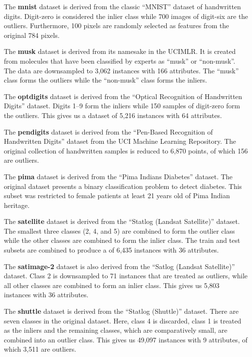 \documentclass{article}
\begin{document}
The \textbf{mnist} dataset is derived from the classic ``MNIST'' dataset of handwritten digits.
Digit-zero is considered the inlier class while 700 images of digit-six are the outliers.
Furthermore, 100 pixels are randomly selected as features from the original 784 pixels.

The \textbf{musk} dataset is derived from its namesake in the UCIMLR\@.
It is created from molecules that have been classified by experts as ``musk'' or ``non-musk''.
The data are downsampled to 3,062 instances with 166 attributes.
The ``musk'' class forms the outliers while the ``non-musk'' class forms the inliers.

The \textbf{optdigits} dataset is derived from the ``Optical Recognition of Handwritten Digits'' dataset.
Digits 1--9 form the inliers while 150 samples of digit-zero form the outliers.
This gives us a dataset of 5,216 instances with 64 attributes.

The \textbf{pendigits} dataset is derived from the ``Pen-Based Recognition of Handwritten Digits'' dataset from the UCI Machine Learning Repository.
The original collection of handwritten samples is reduced to 6,870 points, of which 156 are outliers.

The \textbf{pima} dataset is derived from the ``Pima Indians Diabetes'' dataset.
The original dataset presents a binary classification problem to detect diabetes.
This subset was restricted to female patients at least 21 years old of Pima Indian heritage.

The \textbf{satellite} dataset is derived from the ``Statlog (Landsat Satellite)'' dataset.
The smallest three classes (2, 4, and 5) are combined to form the outlier class while the other classes are combined to form the inlier class.
The train and test subsets are combined to produce a of 6,435 instances with 36 attributes.

The \textbf{satimage-2} dataset is also derived from the ``Satlog (Landsat Satellite)'' dataset.
Class 2 is downsampled to 71 instances that are treated as outliers, while all other classes are combined to form an inlier class.
This gives us 5,803 instances with 36 attributes.

The \textbf{shuttle} dataset is derived from the ``Statlog (Shuttle)'' dataset.
There are seven classes in the original dataset.
Here, class 4 is discarded, class 1 is treated as the inliers and the remaining classes, which are comparatively small, are combined into an outlier class.
This gives us 49,097 instances with 9 attributes, of which 3,511 are outliers.
\end{document}
